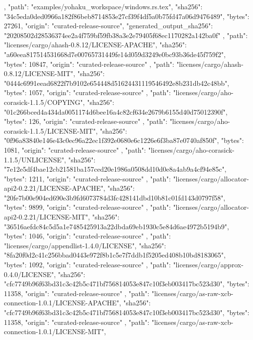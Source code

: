 {{{      }
    },
    {
      "path": "examples/yohaku_workspace/windows.rs.tex",
      "sha256": "34c5eda0ded0966a182f86beb8714853e27cf39f4df5a0b75fd47a06d9476489",
      "bytes": 27261,
      "origin": "curated-release-source",
      "generated_output_sha256": "20208502d28536374ee2a4f759bf59fb38a3e2e79405f68ec1170282a142ba0f"
    },
    {
      "path": "licenses/cargo/ahash-0.8.12/LICENSE-APACHE",
      "sha256": "a60eea817514531668d7e00765731449fe14d059d3249e0bc93b36de45f759f2",
      "bytes": 10847,
      "origin": "curated-release-source"
    },
    {
      "path": "licenses/cargo/ahash-0.8.12/LICENSE-MIT",
      "sha256": "0444c6991eead6822f7b9102e654448d51624431119546492e8b231db42c48bb",
      "bytes": 1057,
      "origin": "curated-release-source"
    },
    {
      "path": "licenses/cargo/aho-corasick-1.1.5/COPYING",
      "sha256": "01c266bced4a434da0051174d6bee16a4c82cf634e2679b6155d40d75012390f",
      "bytes": 126,
      "origin": "curated-release-source"
    },
    {
      "path": "licenses/cargo/aho-corasick-1.1.5/LICENSE-MIT",
      "sha256": "0f96a83840e146e43c0ec96a22ec1f392e0680e6c1226e6f3ba87e0740af850f",
      "bytes": 1081,
      "origin": "curated-release-source"
    },
    {
      "path": "licenses/cargo/aho-corasick-1.1.5/UNLICENSE",
      "sha256": "7e12e5df4bae12cb21581ba157ced20e1986a0508dd10d0e8a4ab9a4cf94e85c",
      "bytes": 1211,
      "origin": "curated-release-source"
    },
    {
      "path": "licenses/cargo/allocator-api2-0.2.21/LICENSE-APACHE",
      "sha256": "20fe7b00e904ed690e3b9fd6073784d3fc428141dbd10b81c01fd143d0797f58",
      "bytes": 9899,
      "origin": "curated-release-source"
    },
    {
      "path": "licenses/cargo/allocator-api2-0.2.21/LICENSE-MIT",
      "sha256": "36516aefdc84c5d5a1e7485425913a22dbda69eb1930c5e84d6ae4972b5194b9",
      "bytes": 1046,
      "origin": "curated-release-source"
    },
    {
      "path": "licenses/cargo/appendlist-1.4.0/LICENSE",
      "sha256": "8fa20f0d2c41c256bbad0443e972f8b1c5e7f7ddb1f5205ed408b10bd8183065",
      "bytes": 1092,
      "origin": "curated-release-source"
    },
    {
      "path": "licenses/cargo/approx-0.4.0/LICENSE",
      "sha256": "cfc7749b96f63bd31c3c42b5c471bf756814053e847c10f3eb003417bc523d30",
      "bytes": 11358,
      "origin": "curated-release-source"
    },
    {
      "path": "licenses/cargo/as-raw-xcb-connection-1.0.1/LICENSE-APACHE",
      "sha256": "cfc7749b96f63bd31c3c42b5c471bf756814053e847c10f3eb003417bc523d30",
      "bytes": 11358,
      "origin": "curated-release-source"
    },
    {
      "path": "licenses/cargo/as-raw-xcb-connection-1.0.1/LICENSE-MIT",
}}
